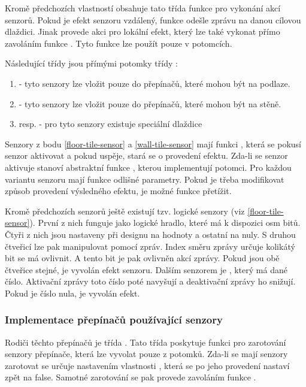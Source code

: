 Kromě předchozích vlastností obsahuje tato třída funkce pro vykonání akcí senzorů. Pokud je efekt senzoru vzdálený, funkce   odešle zprávu 
na danou cílovou dlaždici. Jinak provede akci pro lokální efekt, který lze 
také vykonat přímo zavoláním funkce . Tyto funkce lze použít pouze v potomcích.

Následující třídy jsou přímými potomky třídy :

\begin{enumerate}
\item\label{floor-tile-sensor}  - tyto senzory lze vložit pouze do přepínačů, které mohou být na podlaze.
\item\label{wall-tile-sensor}  - tyto senzory lze vložit pouze do přepínačů, které mohou být na stěně.
\item {} resp.  - pro tyto senzory existuje speciální dlaždice 
\end{enumerate}

Senzory z bodu \ref{floor-tile-sensor} a \ref{wall-tile-sensor} mají funkci , která se pokusí senzor 
aktivovat a pokud uspěje, stará se o provedení efektu. Zda-li se senzor aktivuje stanoví abstraktní funkce ,
kterou implementují potomci. Pro každou variantu senzoru mají funkce odlišné parametry. Pokud je třeba modifikovat způsob 
provedení výsledného efektu, je možné funkce  přetížit.

Kromě předchozích senzorů ještě existují tzv. logické senzory (viz \ref{floor-tile-sensor}). První z nich  funguje 
jako logické hradlo, které má k dispozici osm bitů. Čtyři z nich jsou nastaveny při designu na hodnoty a ostatní na nuly. 
S druhou čtveřicí lze pak manipulovat pomocí zpráv. Index směru zprávy určuje kolikátý bit se má ovlivnit. A tento bit
je pak ovlivněn akcí zprávy. Pokud jsou obě čtveřice stejné, je vyvolán efekt senzoru. Dalším
senzorem je , který má dané číslo. Aktivační zprávy toto číslo poté navyšují a deaktivační zprávy
ho snižují. Pokud je číslo  nula, je vyvolán efekt.
 
\subsubsection{Implementace přepínačů používající senzory}

Rodiči těchto přepínačů je třída . Tato třída poskytuje funkci pro zarotování senzory přepínače, která
lze vyvolat pouze z potomků. Zda-li se mají senzory zarotovat se určuje nastavením vlastnosti , která se po jeho 
provedení nastaví zpět na false. Samotné zarotování se pak provede zavoláním funkce .

